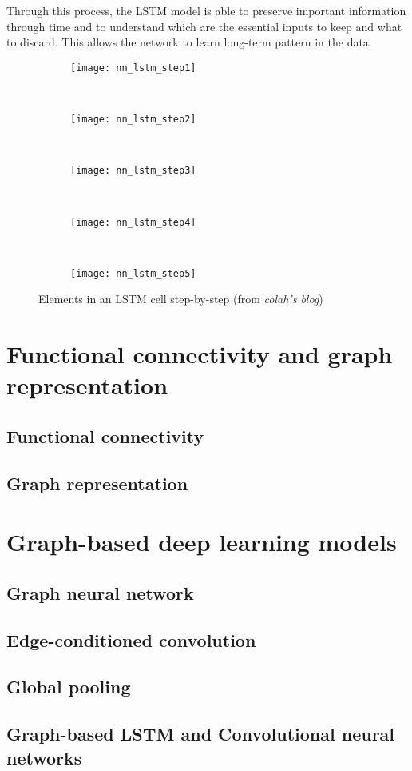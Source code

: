 Through this process, the LSTM model is able to preserve important information through time and to understand which are the essential inputs to keep and what to discard. This allows the network to learn long-term pattern in the data.
\newpage
\begin{figure}[H]
    \centering
    \begin{subfigure}[t]{0.7\textwidth}
		\texttt{[image: nn\_lstm\_step1]}
        \caption{}
        \label{fig:nn_lstm_step1}
	\end{subfigure}
	~
	\begin{subfigure}[t]{0.7\textwidth}
		\texttt{[image: nn\_lstm\_step2]}
        \caption{}
        \label{fig:nn_lstm_step2}
    \end{subfigure}
    ~
    \begin{subfigure}[t]{0.7\textwidth}
		\texttt{[image: nn\_lstm\_step3]}
        \caption{}
        \label{fig:nn_lstm_step3}
    \end{subfigure}
    ~
    \begin{subfigure}[t]{0.7\textwidth}
		\texttt{[image: nn\_lstm\_step4]}
        \caption{}
        \label{fig:nn_lstm_step4}
    \end{subfigure}
    ~
    \begin{subfigure}[t]{0.7\textwidth}
		\texttt{[image: nn\_lstm\_step5]}
        \caption{}
        \label{fig:nn_lstm_step5}
    \end{subfigure}
    \caption{Elements in an LSTM cell step-by-step (from \textit{colah's blog})}
    \label{fig:lstm_steps}
\end{figure}
\newpage


\section{Functional connectivity and graph representation}
\subsection{Functional connectivity}
\subsection{Graph representation}

\section{Graph-based deep learning models}
\subsection{Graph neural network}
\subsection{Edge-conditioned convolution}
\subsection{Global pooling}
\subsection{Graph-based LSTM and Convolutional neural networks}